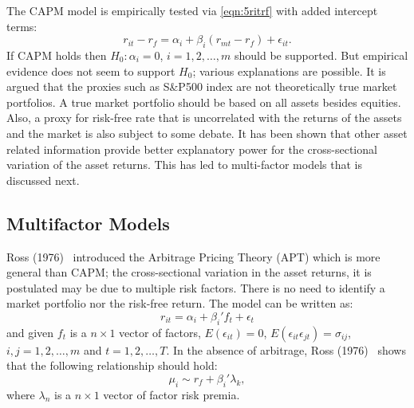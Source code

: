 The CAPM model is empirically tested via \eqref{eqn:5ritrf} with added intercept terms:
	\begin{equation}\label{eqn:intercept}
	r_{it} - r_f = \alpha_i + \beta_i (r_{mt} - r_f) + \epsilon_{it}.
	\end{equation}
If CAPM holds then $H_0: \alpha_i=0$, $i=1,2,\ldots,m$ should be supported. But empirical evidence does not seem to support $H_0$; various explanations are possible. It is argued that the proxies such as S\&P500 index are not theoretically true market portfolios. A true market portfolio should be based on all assets besides equities. Also, a proxy for risk-free rate that is uncorrelated with the returns of the assets and the market is also subject to some debate. It has been shown that other asset related information provide better explanatory power for the cross-sectional variation of the asset returns. This has led to multi-factor models that is discussed next. 



\subsection{Multifactor Models}


Ross (1976)~\cite{rossarb} introduced the Arbitrage Pricing Theory (APT) which is more general than CAPM; the cross-sectional variation in the asset returns, it is postulated may be due to multiple risk factors. There is no need to identify a market portfolio nor the risk-free return. The model can be written as:
	\begin{equation}\label{eqn:arbrit}
	r_{it} = \alpha_i + \beta_i' f_t + \epsilon_t
	\end{equation}
and given $f_t$ is a $n \times 1$ vector of factors, $E(\epsilon_{it})=  0$, $E(\epsilon_{it}\epsilon_{jt})= \sigma_{ij}$, $i,j= 1, 2, \ldots, m$ and $t= 1, 2, \ldots, T$. In the absence of arbitrage, Ross (1976)~\cite{rossarb} shows that the following relationship should hold:
	\begin{equation} \label{eqn:mewirf}
	\mu_i \sim r_f + \beta_i' \lambda_k,
	\end{equation}
where $\lambda_n$ is a $n \times 1$ vector of factor risk premia.


